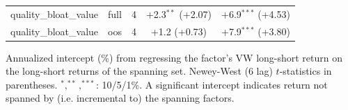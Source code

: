 \begin{table}[htbp]
\begin{threeparttable}
\begin{tabular}{llccc}
quality\_bloat\_value & full & 4 & +2.3$^{**}$ (+2.07) & +6.9$^{***}$ (+4.53) \\
quality\_bloat\_value & oos & 4 & +1.2 (+0.73) & +7.9$^{***}$ (+3.80) \\
\bottomrule
\end{tabular}
\begin{tablenotes}\footnotesize
\item Annualized intercept (\%) from regressing the factor's VW long-short return on the long-short returns of the spanning set. Newey-West (6 lag) $t$-statistics in parentheses. $^{*},^{**},^{***}$: 10/5/1\%. A significant intercept indicates return not spanned by (i.e. incremental to) the spanning factors.
\end{tablenotes}
\end{threeparttable}
\end{table}